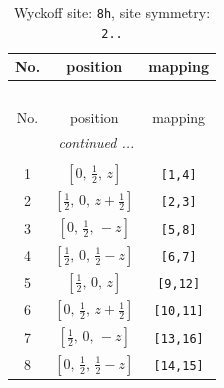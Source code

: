 \documentclass[fleqn,8pt]{jsarticle}
\begin{document}
\begin{longtable}{ccc}
\caption{Wyckoff site: {\tt 8h}, site symmetry: {\tt 2..}}
 \\
 \hline \hline
No. & position & mapping \\ \hline \endfirsthead

\multicolumn{2}{l}{\tablename\ \thetable{}} \\
 \hline \hline
No. & position & mapping \\ \hline \endhead

 \hline \hline
\multicolumn{2}{r}{\footnotesize\it continued ...} \\ \endfoot

 \hline \hline
\multicolumn{2}{r}{} \\ \endlastfoot

1 & $\left[ 0,\, \frac{1}{2},\, z \right]$ & {\tt [1,4]} \\ \hline
2 & $\left[ \frac{1}{2},\, 0,\, z + \frac{1}{2} \right]$ & {\tt [2,3]} \\ \hline
3 & $\left[ 0,\, \frac{1}{2},\, - z \right]$ & {\tt [5,8]} \\ \hline
4 & $\left[ \frac{1}{2},\, 0,\, \frac{1}{2} - z \right]$ & {\tt [6,7]} \\ \hline
5 & $\left[ \frac{1}{2},\, 0,\, z \right]$ & {\tt [9,12]} \\ \hline
6 & $\left[ 0,\, \frac{1}{2},\, z + \frac{1}{2} \right]$ & {\tt [10,11]} \\ \hline
7 & $\left[ \frac{1}{2},\, 0,\, - z \right]$ & {\tt [13,16]} \\ \hline
8 & $\left[ 0,\, \frac{1}{2},\, \frac{1}{2} - z \right]$ & {\tt [14,15]} \\
\end{longtable}
\renewcommand{\arraystretch}{1.2}
\end{document}

